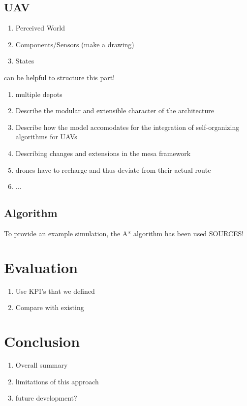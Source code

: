 \subsection{UAV}
\begin{enumerate}
	\item Perceived World
	\item Components/Sensors (make a drawing)
	\item States
\end{enumerate}


\cite{jang.2005} can be helpful to structure this part!


\begin{enumerate}
	\item multiple depots
	\item Describe the modular and extensible character of the architecture
	\item Describe how the model accomodates for the integration of self-organizing algorithms for UAVs
	\item Describing changes and extensions in the mesa framework
	\item drones have to recharge and thus deviate from their actual route
	\item ...
	
\end{enumerate}


\subsection{Algorithm}
To provide an example simulation, the A* algorithm has been used 
SOURCES!

\section{Evaluation}
\begin{enumerate}
	\item Use KPI's that we defined
	\item Compare with existing
\end{enumerate}

\section{Conclusion}
\begin{enumerate}
	\item Overall summary
	\item limitations of this approach
	\item future development?
\end{enumerate}

